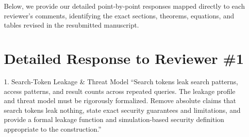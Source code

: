 \documentclass[11pt,a4paper]{article}
\begin{document}
\noindent Below, we provide our detailed point-by-point responses mapped directly to each reviewer's comments, identifying the exact sections, theorems, equations, and tables revised in the resubmitted manuscript.

\vspace{1.5em}

\section{Detailed Response to Reviewer \#1}

\begin{reviewbox}{1. Search-Token Leakage \& Threat Model}
``Search tokens leak search patterns, access patterns, and result counts across repeated queries. The leakage profile and threat model must be rigorously formalized. Remove absolute claims that search tokens leak nothing, state exact security guarantees and limitations, and provide a formal leakage function and simulation-based security definition appropriate to the construction.''
\end{reviewbox}
\end{document}
